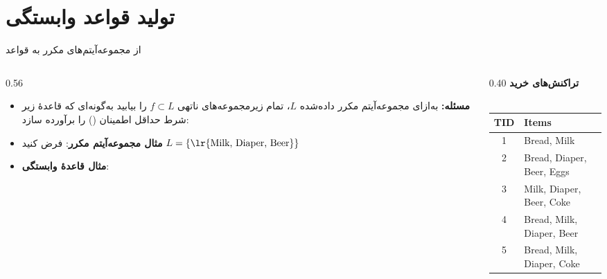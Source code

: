 \section{تولید قواعد وابستگی}

\begin{frame}{از مجموعه‌آیتم‌های مکرر به قواعد}{}
\begin{columns}[T,onlytextwidth]
\begin{column}{0.56\textwidth}
\begin{itemize}\setlength{\itemsep}{4pt}\small
    \item \textbf{مسئله:} به‌ازای مجموعه‌آیتم مکرر داده‌شده $L$، تمام زیرمجموعه‌های ناتهی $f \subset L$ را بیابید به‌گونه‌ای که قاعدهٔ زیر شرط حداقل اطمینان () را برآورده سازد:
    \par\vspace{1pt}\noindent{}\par\vspace{2pt}
    \item \textbf{مثال مجموعه‌آیتم مکرر}: فرض کنید $L = \{\text{\lr{Milk, Diaper, Beer}}\}$
    \item \textbf{مثال قاعدهٔ وابستگی}:
    \par\vspace{1pt}\noindent{}\par\vspace{2pt}
    \par\vspace{1pt}\noindent{}\par\vspace{2pt}
\end{itemize}
\end{column}%
\begin{column}{0.40\textwidth}
\centering
\textbf{\small تراکنش‌های خرید}\\[1pt]
{\scriptsize{}}\\[3pt]
\begin{latin}
\fontsize{7.5}{9.5}\selectfont
\begin{tabular}{|c|l|}
\hline
\rowcolor{mannheimblue!15}
\textbf{TID} & \textbf{Items} \\ \hline
1 & Bread, Milk \\ \hline
2 & Bread, Diaper, Beer, Eggs \\ \hline
3 & Milk, Diaper, Beer, Coke \\ \hline
4 & Bread, Milk, Diaper, Beer \\ \hline
5 & Bread, Milk, Diaper, Coke \\ \hline
\end{tabular}
\end{latin}
\end{column}
\end{columns}
\end{frame}

